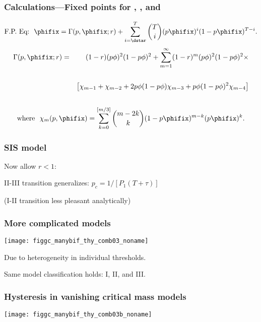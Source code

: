 \begin{frame}
  \frametitle{Calculations---Fixed points for , , and }
  $$
  \mbox{F.P.\ Eq:} \ \
  \phifix = \Gamma(p,\phifix;r) 
  + \sum_{i=\dstar}^{T}
  \binom{T}{i}
  (p\phifix)^{i} (1 - p\phifix)^{T-i}.
  $$
  \begin{eqnarray*}
  \Gamma(p,\phifix;r) & = & (1-r)(p\phi)^2 (1-p\phi)^2 
   +  \sum_{m=1}^{\infty} (1-r)^m 
  (p\phi)^2 (1-p\phi)^2 \times
  \\ \nonumber
  \\ \nonumber
  &  & 
  \left[ 
    \chi_{m-1} + 
    \chi_{m-2} + 
    2p\phi (1-p\phi)\chi_{m-3} + 
    p\phi (1-p\phi)^2\chi_{m-4}
  \right]
  \\ \nonumber
  \end{eqnarray*}
  $$
  \mbox{where} \ \  \chi_m(p,\phifix)
  = 
  \sum_{k=0}^{[m/3]}
  \binom{m-2k}{k}
  (1-p\phifix)^{m-k}
  (p\phifix)^k.
  $$

\end{frame}


\begin{frame}
  \frametitle{SIS model}

  Now allow $r<1$: \hfill

II-III transition generalizes: $p_c = 1/[P_1 (T + \tau)]$ 

(I-II transition less pleasant analytically)

\end{frame}

\begin{frame}
  \frametitle{More complicated models}

  \texttt{[image: figgc\_manybif\_thy\_comb03\_noname]}

  \ding{228} Due to heterogeneity in individual thresholds.

  \ding{228} Same model classification holds:  I, II, and III.
\end{frame}

\begin{frame}
  \frametitle{Hysteresis in vanishing critical mass models}

  \centering
  \texttt{[image: figgc\_manybif\_thy\_comb03b\_noname]}

\end{frame}

 


